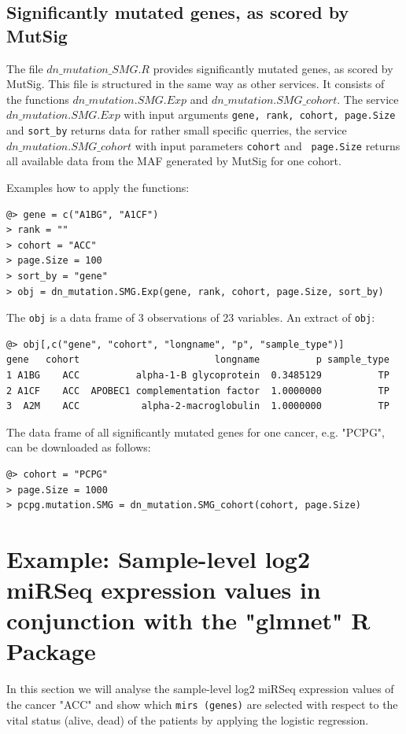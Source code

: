 \documentclass{TechReport}
\begin{document}
\subsection{Significantly mutated genes, as scored by MutSig}
The file $dn\_mutation\_SMG.R$ provides significantly mutated genes,
as scored by MutSig. This file is structured in the same way as other
services. It consists of the functions $dn\_mutation.SMG.Exp$ and
$dn\_mutation.SMG\_cohort$. The service $dn\_mutation.SMG.Exp$ with
input arguments {\tt gene, rank, cohort, page.Size} and {\tt sort\_by}
returns data for rather small specific querries, the service
$dn\_mutation.SMG\_cohort$ with input parameters {\tt cohort} and {\tt
  page.Size} returns all available data from the MAF generated by
MutSig for one cohort.

Examples how to apply the functions:
\begin{lstlisting}[style=base]
@> gene = c("A1BG", "A1CF")
> rank = ""
> cohort = "ACC"
> page.Size = 100
> sort_by = "gene"
> obj = dn_mutation.SMG.Exp(gene, rank, cohort, page.Size, sort_by)
\end{lstlisting}
The {\tt obj} is a data frame of 3 observations of 23 variables. An extract of {\tt obj}:
\begin{lstlisting}[style=base]
@> obj[,c("gene", "cohort", "longname", "p", "sample_type")]
gene   cohort                        longname          p sample_type
1 A1BG    ACC          alpha-1-B glycoprotein  0.3485129          TP
2 A1CF    ACC  APOBEC1 complementation factor  1.0000000          TP
3  A2M    ACC           alpha-2-macroglobulin  1.0000000          TP
\end{lstlisting}
The data frame of all significantly mutated genes for one cancer, e.g. "PCPG", 
can be downloaded as follows:
\begin{lstlisting}[style=base]
@> cohort = "PCPG"
> page.Size = 1000
> pcpg.mutation.SMG = dn_mutation.SMG_cohort(cohort, page.Size)
\end{lstlisting}




\section{Example: Sample-level log2 miRSeq expression values in conjunction with the
"glmnet" R Package}
In this section we will analyse the sample-level log2 miRSeq expression values of
the cancer "ACC" and show which
{\tt mirs (genes)} are selected with respect to the vital status (alive, dead) of
the patients by applying the logistic 
regression.
\end{document}
